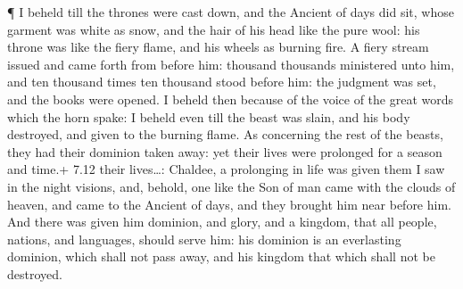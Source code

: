  ¶ I beheld till the thrones were cast down, and the Ancient
of days did sit, whose garment was white as snow, and the hair of his
head like the pure wool: his throne was like the fiery flame, and his
wheels as burning fire.  A fiery stream issued and came
forth from before him: thousand thousands ministered unto him, and ten
thousand times ten thousand stood before him: the judgment was set, and
the books were opened.  I beheld then because of the voice
of the great words which the horn spake: I beheld even till the beast
was slain, and his body destroyed, and given to the burning flame.
 As concerning the rest of the beasts, they had their
dominion taken away: yet their lives were prolonged for a season and
time.+ 7.12 their lives\ldots: Chaldee, a prolonging in life was given
them  I saw in the night visions, and, behold, one like the
Son of man came with the clouds of heaven, and came to the Ancient of
days, and they brought him near before him.  And there was
given him dominion, and glory, and a kingdom, that all people, nations,
and languages, should serve him: his dominion is an everlasting
dominion, which shall not pass away, and his kingdom that which shall
not be destroyed.

